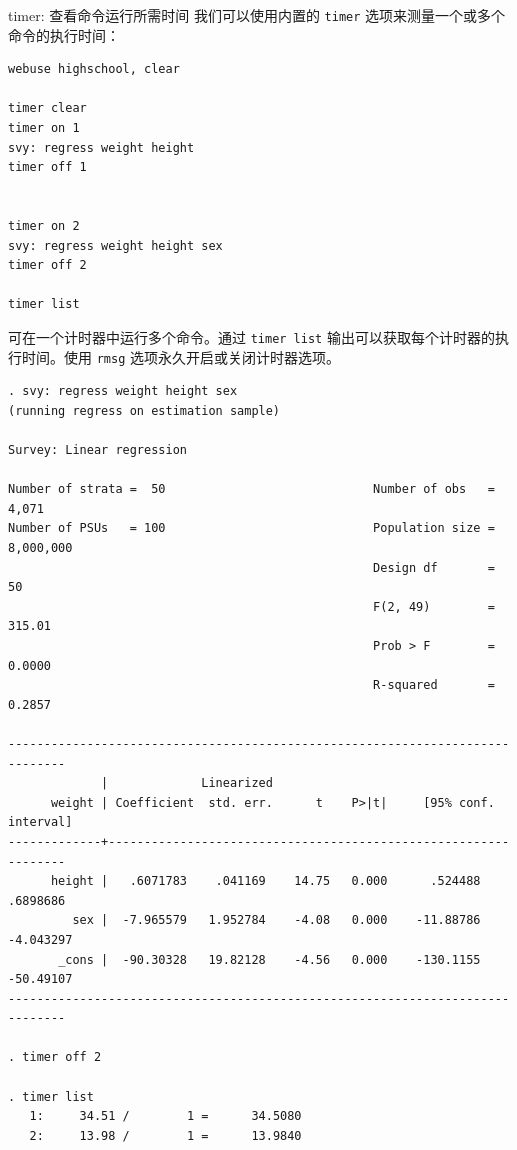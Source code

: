 \documentclass[
  ignorenonframetext,
  aspectratio=169,
  fontset=ubuntu]{ctexbeamer}
\begin{document}
\begin{frame}[fragile]{timer: 查看命令运行所需时间}
\label{timer-ux67e5ux770bux547dux4ee4ux8fd0ux884cux6240ux9700ux65f6ux95f4}
我们可以使用内置的 \texttt{timer}
选项来测量一个或多个命令的执行时间：

\begin{verbatim}
webuse highschool, clear  
  
timer clear  
timer on 1  
svy: regress weight height  
timer off 1  
  
  
timer on 2  
svy: regress weight height sex  
timer off 2  
  
timer list
\end{verbatim}

可在一个计时器中运行多个命令。通过 \texttt{timer list}
输出可以获取每个计时器的执行时间。使用 \texttt{rmsg}
选项永久开启或关闭计时器选项。

\begin{verbatim}
. svy: regress weight height sex
(running regress on estimation sample)

Survey: Linear regression

Number of strata =  50                             Number of obs   =     4,071
Number of PSUs   = 100                             Population size = 8,000,000
                                                   Design df       =        50
                                                   F(2, 49)        =    315.01
                                                   Prob > F        =    0.0000
                                                   R-squared       =    0.2857

------------------------------------------------------------------------------
             |             Linearized
      weight | Coefficient  std. err.      t    P>|t|     [95% conf. interval]
-------------+----------------------------------------------------------------
      height |   .6071783    .041169    14.75   0.000      .524488    .6898686
         sex |  -7.965579   1.952784    -4.08   0.000    -11.88786   -4.043297
       _cons |  -90.30328   19.82128    -4.56   0.000    -130.1155   -50.49107
------------------------------------------------------------------------------

. timer off 2

. timer list
   1:     34.51 /        1 =      34.5080
   2:     13.98 /        1 =      13.9840

\end{verbatim}
\end{frame}
\end{document}

